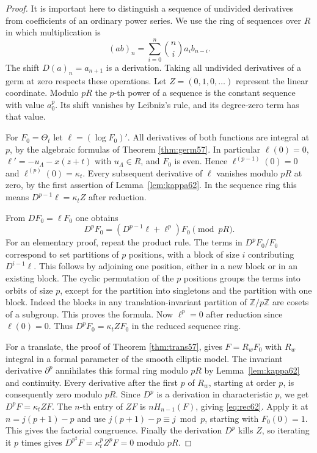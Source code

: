 \documentclass[a4paper,11pt]{article}
\theoremstyle{definition}
\theoremstyle{remark}
\newcommand{\ZZ}{\mathbb Z}\newcommand{\ord}{\operatorname{ord}}
\numberwithin{equation}{section}
\begin{document}
\begin{proof}
It is important here to distinguish a sequence of undivided
derivatives from coefficients of an ordinary power series.
We use the ring of sequences over \(R\) in which multiplication is
\[
        (ab)_n=\sum_{i=0}^n\binom ni a_i b_{n-i}.
\]
The shift \(D(a)_n=a_{n+1}\) is a derivation. Taking all
undivided derivatives of a germ at zero respects these operations.
Let \(Z=(0,1,0,\ldots)\) represent the linear coordinate.
Modulo \(pR\) the \(p\)-th power of a sequence is the constant
sequence with value \(a_0^p\). Its shift vanishes by Leibniz's rule,
and its degree-zero term has that value.

For \(F_0=\Theta_t\) let \(\ell=(\log F_0)'\).
All derivatives of both functions are integral at \(p\), by
the algebraic formulas of Theorem \ref{thm:germ57}.
In particular \(\ell(0)=0\),
\(\ell'=-u_\Lambda-x(z+t)\) with \(u_\Lambda\in R\), and
\(F_0\) is even. Hence \(\ell^{(p-1)}(0)=0\) and
\(\ell^{(p)}(0)=\kappa_t\). Every subsequent derivative of
\(\ell\) vanishes modulo \(pR\) at zero, by the first assertion
of Lemma~\ref{lem:kappa62}. In the sequence ring this means
\(D^{p-1}\ell=\kappa_t Z\) after reduction.

From \(DF_0=\ell F_0\) one obtains
\[
       D^p F_0=(D^{p-1}\ell+\ell^p)F_0\pmod {pR}.
\]
For an elementary proof, repeat the product rule. The terms in
\(D^p F_0/F_0\) correspond to set partitions of \(p\) positions,
with a block of size \(i\) contributing \(D^{i-1}\ell\).
This follows by adjoining one position, either in a new block
or in an existing block. The cyclic permutation of the \(p\)
positions groups the terms into orbits of size \(p\), except for
the partition into singletons and the partition with one block.
Indeed the blocks in any translation-invariant partition of
\(\ZZ/p\ZZ\) are cosets of a subgroup. This proves the formula.
Now \(\ell^p=0\) after reduction since \(\ell(0)=0\).
Thus \(D^p F_0=\kappa_t ZF_0\) in the reduced sequence ring.

For a translate, the proof of Theorem \ref{thm:trans57}, gives
\(F=R_wF_0\) with \(R_w\) integral in a formal parameter of the
smooth elliptic model. The invariant derivative \(\partial^p\)
annihilates this formal ring modulo \(pR\) by Lemma~\ref{lem:kappa62}
and continuity. Every derivative after the first \(p\) of
\(R_w\), starting at order \(p\), is consequently zero modulo
\(pR\). Since \(D^p\) is a derivation in characteristic \(p\),
we get \(D^p F=\kappa_t ZF\). The \(n\)-th entry of \(ZF\)
is \(nH_{n-1}(F)\), giving \eqref{eq:rec62}.
Apply it at \(n=j(p+1)-p\) and use
\(j(p+1)-p\equiv j\bmod p\), starting with \(F_0(0)=1\).
This gives the factorial congruence. Finally the derivation
\(D^p\) kills \(Z\), so iterating it \(p\) times gives
\(D^{p^2}F=\kappa_t^pZ^p F=0\) modulo \(pR\).
\end{proof}
\end{document}
